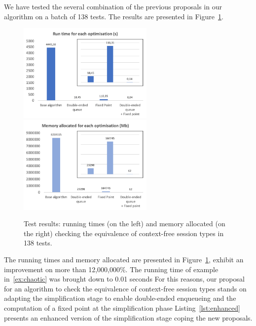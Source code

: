 We have tested the several combination of the previous proposals
in our algorithm on a batch of 138 tests. The results are presented 
in Figure~\ref{fig:results}.

\begin{figure}[h]
	\includegraphics[height=4.8cm]{img/run_time}	\qquad 
	\includegraphics[height=4.8cm]{img/memory_alloc}	
	\caption{Test results: running times (on the left) and
	memory allocated (on the right) checking the equivalence 
	of context-free session types in 138 tests.}
	\label{fig:results}
\end{figure}

The running times and memory allocated are presented in
Figure~\ref{fig:results}, exhibit an improvement on more than
12,000,000\%. The running time of example in~\eqref{ex:chaotic} was
brought down to 0.01 seconds  For this reasons, our
proposal for an algorithm to check the equivalence of context-free
session types stands on adapting the simplification stage to enable
double-ended enqueueing and the computation of a fixed point at the
simplification phase Listing~\ref{lst:enhanced} presents an enhanced
version of the simplification stage coping the new proposals.



